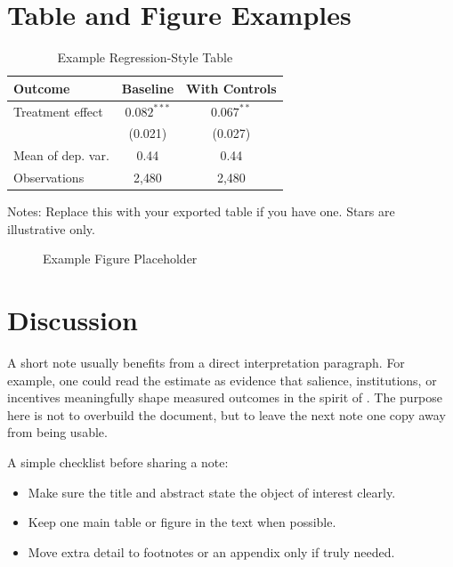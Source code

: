 \documentclass[11pt]{article}
\begin{document}
\section{Table and Figure Examples}

% 

\begin{table}[H]
  \centering
  \begin{threeparttable}
    \caption{Example Regression-Style Table}
    \begin{tabular}{lcc}
      \toprule
      Outcome & Baseline & With Controls \\
      \midrule
      Treatment effect & $0.082^{***}$ & $0.067^{**}$ \\
      & (0.021) & (0.027) \\
      Mean of dep. var. & 0.44 & 0.44 \\
      Observations & 2{,}480 & 2{,}480 \\
      \bottomrule
    \end{tabular}
    \begin{tablenotes}[flushleft]
      \footnotesize
      \item Notes: Replace this with your exported table if you have one. Stars are illustrative only.
    \end{tablenotes}
  \end{threeparttable}
\end{table}

\begin{figure}[H]
  \centering
  \caption{Example Figure Placeholder}
\end{figure}

\section{Discussion}

A short note usually benefits from a direct interpretation paragraph. For example, one could read the estimate as evidence that salience, institutions, or incentives meaningfully shape measured outcomes in the spirit of \citet{chetty2009}. The purpose here is not to overbuild the document, but to leave the next note one copy away from being usable.

A simple checklist before sharing a note:
\begin{itemize}
  \item Make sure the title and abstract state the object of interest clearly.
  \item Keep one main table or figure in the text when possible.
  \item Move extra detail to footnotes or an appendix only if truly needed.
\end{itemize}



\end{document}
